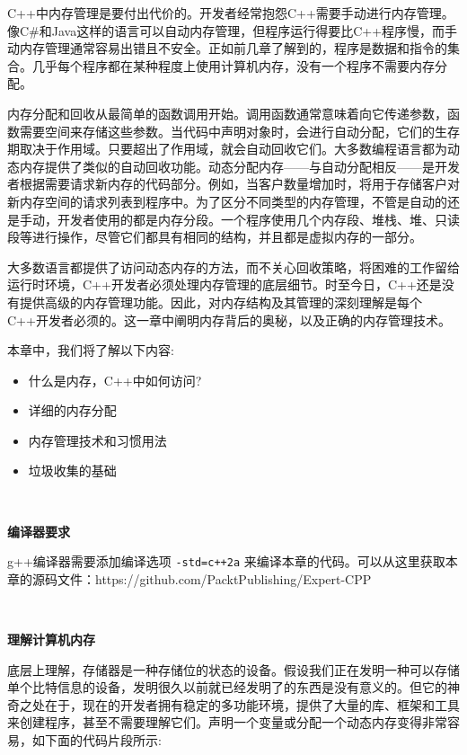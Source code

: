 C++中内存管理是要付出代价的。开发者经常抱怨C++需要手动进行内存管理。像C\#和Java这样的语言可以自动内存管理，但程序运行得要比C++程序慢，而手动内存管理通常容易出错且不安全。正如前几章了解到的，程序是数据和指令的集合。几乎每个程序都在某种程度上使用计算机内存，没有一个程序不需要内存分配。 \par
内存分配和回收从最简单的函数调用开始。调用函数通常意味着向它传递参数，函数需要空间来存储这些参数。当代码中声明对象时，会进行自动分配，它们的生存期取决于作用域。只要超出了作用域，就会自动回收它们。大多数编程语言都为动态内存提供了类似的自动回收功能。动态分配内存——与自动分配相反——是开发者根据需要请求新内存的代码部分。例如，当客户数量增加时，将用于存储客户对新内存空间的请求列表到程序中。为了区分不同类型的内存管理，不管是自动的还是手动，开发者使用的都是内存分段。一个程序使用几个内存段、堆栈、堆、只读段等进行操作，尽管它们都具有相同的结构，并且都是虚拟内存的一部分。 \par
大多数语言都提供了访问动态内存的方法，而不关心回收策略，将困难的工作留给运行时环境，C++开发者必须处理内存管理的底层细节。时至今日，C++还是没有提供高级的内存管理功能。因此，对内存结构及其管理的深刻理解是每个C++开发者必须的。这一章中阐明内存背后的奥秘，以及正确的内存管理技术。 \par
本章中，我们将了解以下内容: \par

\begin{itemize}
	\item 什么是内存，C++中如何访问?
	\item 详细的内存分配
	\item 内存管理技术和习惯用法
	\item 垃圾收集的基础
\end{itemize}

\noindent\textbf{}\ \par
\textbf{编译器要求} \ \par
g++编译器需要添加编译选项 \texttt{-std=c++2a} 来编译本章的代码。可以从这里获取本章的源码文件：https:/​/github.​com/PacktPublishing/Expert-CPP \par

\noindent\textbf{}\ \par
\textbf{理解计算机内存} \ \par
底层上理解，存储器是一种存储位的状态的设备。假设我们正在发明一种可以存储单个比特信息的设备，发明很久以前就已经发明了的东西是没有意义的。但它的神奇之处在于，现在的开发者拥有稳定的多功能环境，提供了大量的库、框架和工具来创建程序，甚至不需要理解它们。声明一个变量或分配一个动态内存变得非常容易，如下面的代码片段所示: \par


